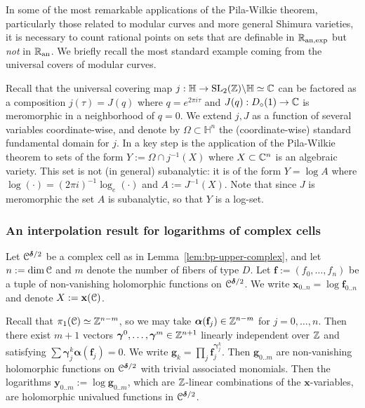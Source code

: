 \documentclass[reqno]{amsart}
\renewcommand\~[1]{\widetilde{#1}}
\def\H{{\mathbb H}}
\def\vf{{\mathbf f}}
\def\vg{{\mathbf g}}
\def\vx{{\mathbf x}}
\def\vy{{\mathbf y}}
\def\valpha{{\boldsymbol\alpha}}
\def\vgamma{{\boldsymbol\gamma}}
\def\vdelta{{\boldsymbol\delta}}
\def\an{{\text{an}}}
\begin{document}
In some of the most remarkable applications of the Pila-Wilkie
theorem, particularly those related to modular curves and more general
Shimura varieties, it is necessary to count rational points on sets
that are definable in $\R_{\an,\exp}$ but \emph{not} in $\R_\an$. We
briefly recall the most standard example coming from the universal
covers of modular curves.

Recall that the universal covering map
$j:\H\to\SL_2(\Z)\backslash \H\simeq\C$ can be factored as a
composition $j(\tau)=J(q)$ where $q=e^{2\pi i\tau}$ and
$J(q):D_\circ(1)\to{\mathbb C}$ is meromorphic in a neighborhood of $q=0$. We
extend $j,J$ as a function of several variables coordinate-wise, and
denote by $\Omega\subset\H^n$ the (coordinate-wise) standard
fundamental domain for $j$. In \cite{pila:andre-oort} a key step is
the application of the Pila-Wilkie theorem to sets of the form
$Y:=\Omega\cap j^{-1}(X)$ where $X\subset{\mathbb C}^n$ is an algebraic
variety. This set is not (in general) subanalytic: it is of the form
$Y=\log A$ where $\log(\cdot)=(2\pi i)^{-1}\log_e(\cdot)$ and
$A:=J^{-1}(X)$. Note that since $J$ is meromorphic the set $A$ is
subanalytic, so that $Y$ is a log-set.

\subsubsection{An interpolation result for logarithms of complex cells}

Let $\cC^{\vdelta/2}$ be a complex cell as in
Lemma~\ref{lem:bp-upper-complex}, and let $n:=\dim{\mathcal C}$ and $m$ denote
the number of fibers of type $D$. Let $\vf:=(f_0,\ldots,f_n)$ be a
tuple of non-vanishing holomorphic functions on $\cC^{\vdelta/2}$. We
write $\vx_{0..n}=\log\vf_{0..n}$ and denote $X:=\vx(\cC)$.

Recall that $\pi_1({\mathcal C})\simeq{\mathbb Z}^{n-m}$, so we may take
$\valpha(\vf_j)\in\Z^{n-m}$ for $j=0,\ldots,n$. Then there exist $m+1$
vectors $\vgamma^0,\ldots,\vgamma^m\in\Z^{n+1}$ linearly independent
over ${\mathbb Z}$ and satisfying $\sum \vgamma^k_j\valpha(\vf_j)=0$. We write
$\vg_k = \prod_j \vf_j^{\vgamma^k_j}$. Then $\vg_{0..m}$ are
non-vanishing holomorphic functions on $\cC^{\vdelta/2}$ with trivial
associated monomials. Then the logarithms
$\vy_{0..m}:=\log\vg_{0..m}$, which are ${\mathbb Z}$-linear combinations of
the $\vx$-variables, are holomorphic univalued functions in
$\cC^{\vdelta/2}$.
\end{document}
